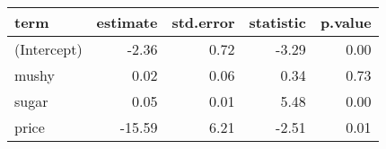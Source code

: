 \begin{tabular}{lrrrr}
  \hline
term & estimate & std.error & statistic & p.value \\ 
  \hline
(Intercept) & -2.36 & 0.72 & -3.29 & 0.00 \\ 
  mushy & 0.02 & 0.06 & 0.34 & 0.73 \\ 
  sugar & 0.05 & 0.01 & 5.48 & 0.00 \\ 
  price & -15.59 & 6.21 & -2.51 & 0.01 \\ 
   \hline
\end{tabular}

